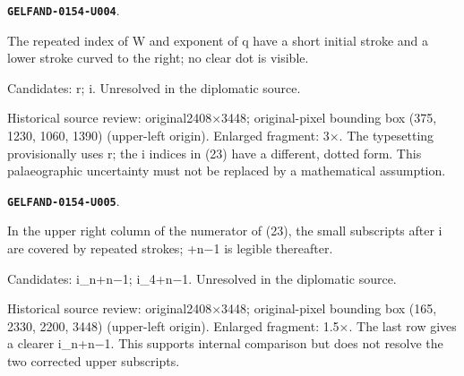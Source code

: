 \documentclass[11pt]{article}
\theoremstyle{definition}
\theoremstyle{remark}
\begin{document}
\par\noindent\leavevmode{}\label{GELFAND-0154-U004}\label{GELFAND-P001415:w-index:note}\textbf{\texttt{GELFAND-0154-U004}}.\nopagebreak[4]\par
The repeated index of W and exponent of q have a short initial stroke and a lower stroke curved to the right; no clear dot is visible.\par
Candidates: r; i. Unresolved in the diplomatic source.\par
Historical source review: original2408×3448; original-pixel bounding box (375, 1230, 1060, 1390) (upper-left origin). Enlarged fragment: 3×. The typesetting provisionally uses r; the i indices in (23) have a different, dotted form. This palaeographic uncertainty must not be replaced by a mathematical assumption.\par\medskip
\par\noindent\leavevmode{}\label{GELFAND-0154-U005}\label{GELFAND-P001415:eq23-overwritten-exponents:note}\textbf{\texttt{GELFAND-0154-U005}}.\nopagebreak[4]\par
In the upper right column of the numerator of (23), the small subscripts after i are covered by repeated strokes; +n−1 is legible thereafter.\par
Candidates: i\_n+n−1; i\_4+n−1. Unresolved in the diplomatic source.\par
Historical source review: original2408×3448; original-pixel bounding box (165, 2330, 2200, 3448) (upper-left origin). Enlarged fragment: 1.5×. The last row gives a clearer i\_n+n−1. This supports internal comparison but does not resolve the two corrected upper subscripts.\par\medskip
\end{document}
